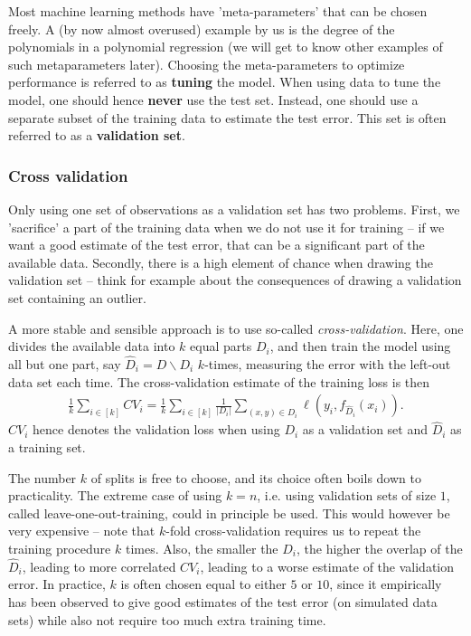 \documentclass{article}
\newcommand{\abs}[1]{\vert #1 \vert}
\begin{document}
Most machine learning methods have 'meta-parameters' that can be chosen freely. A (by now almost overused) example by us is the degree of the polynomials in a polynomial regression (we will get to know other examples of such metaparameters later). Choosing the meta-parameters to optimize performance is referred to as \textbf{tuning} the model. When using data to tune the model, one should hence \textbf{never} use the test set. Instead, one should use a separate subset of the training data to estimate the test error. This set is often referred to as a \textbf{validation set}. 

\subsubsection{Cross validation} Only using one set of observations as a validation set has two problems. First, we 'sacrifice' a part of the training data when we do not use it for training -- if we want a good estimate of the test error, that can be a significant part of the available data. Secondly, there is a high element of chance when drawing the validation set -- think for example about the consequences of drawing a validation set containing an outlier.

A more stable and sensible approach is to use so-called \emph{cross-validation}. Here, one divides the available data into $k$ equal parts $D_i$, and then train the model using all but one part, say $\hat{D}_{i} = D \backslash D_i$ $k$-times, measuring the error with the left-out data set each time. The cross-validation estimate of the training loss is then
\begin{align*}
    \frac{1}{k} \sum_{i\in [k]} CV_i = \frac{1}{k}\sum_{i \in [k]} \frac{1}{\abs{D_i}} \sum_{(x,y) \in D_i} \ell(y_i, f_{\widehat{D}_i}(x_i)).
\end{align*}
$CV_i$ hence denotes the validation loss when using $D_i$ as a validation set and $\hat{D}_{i}$ as a training set. 

The number $k$ of splits is free to choose, and its choice often boils down to practicality. The extreme case of using $k=n$, i.e. using validation sets of size $1$, called leave-one-out-training, could in principle be used. This would however be very expensive -- note that $k$-fold cross-validation requires us to repeat the training procedure $k$ times. Also, the smaller the $D_i$, the higher the overlap of the $\hat{D}_i$, leading to more correlated $CV_i$, leading to a worse estimate of the validation error. In practice, $k$ is  often chosen equal to either $5$ or $10$, since it empirically has been observed to give good estimates of the test error (on simulated data sets) while also not require too much extra training time.
\end{document}
